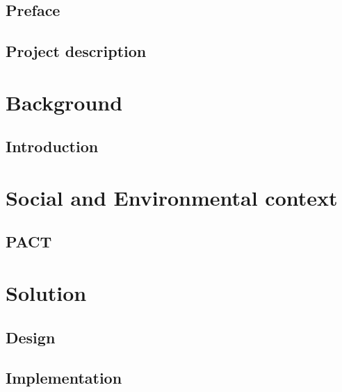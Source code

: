 \documentclass[a4paper,11pt,fleqn,twoside,openright]{memoir} 	%
\begin{document}
\frontmatter


\cleardoublepage

\cleardoublepage

\chapter*{Preface}


\cleardoublepage

{}
\tableofcontents*

\mainmatter

\chapter{Project description}


\part{Background}
\chapter{Introduction}


\part{Social and Environmental context}

\chapter{PACT}





\part{Solution} %

\chapter{Design}
%

\chapter{Implementation}
%
\end{document}
